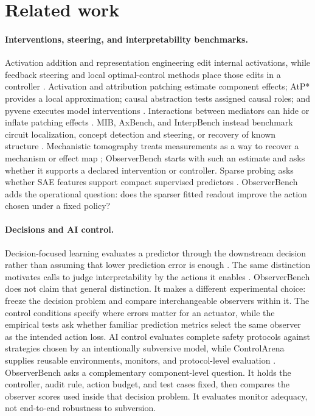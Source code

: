 \section{Related work}

\paragraph{Interventions, steering, and interpretability benchmarks.}
Activation addition and representation engineering edit internal activations,
while feedback steering and local optimal-control methods place those edits in a
controller
\cite{turner2023activation,zou2023representation,nguyen2025feedback,skifstad2026local}.
Activation and attribution patching estimate component effects; AtP* provides a
local approximation; causal abstraction tests assigned causal roles; and pyvene
executes model interventions
\cite{syed2024attribution,kramar2024atp,geiger2024alignments,wu2024pyvene}.
Interactions between mediators can hide or inflate patching effects
\cite{vaidyanathan2026curse}. MIB, AxBench, and InterpBench instead benchmark
circuit localization, concept detection and steering, or recovery of known
structure \cite{mueller2025mib,wu2025axbench,gupta2024interpbench}. Mechanistic
tomography treats measurements as a way to recover a mechanism or effect map
\cite{erramilli2026tomography}; ObserverBench starts with such an estimate and
asks whether it supports a declared intervention or controller.
Sparse probing asks whether SAE features support compact supervised predictors
\cite{kantamneni2025saeprobes}. ObserverBench adds the operational question:
does the sparser fitted readout improve the action chosen under a fixed policy?

\paragraph{Decisions and AI control.}
Decision-focused learning evaluates a predictor through the downstream decision
rather than assuming that lower prediction error is enough
\cite{donti2017task,elmachtoub2022smart}. The same distinction motivates calls
to judge interpretability by the actions it enables \cite{orgad2026actionable}.
ObserverBench does not claim that general distinction. It makes a different
experimental choice: freeze the decision problem and compare interchangeable
observers within it. The control conditions specify where errors matter for
an actuator, while the empirical tests ask whether familiar prediction
metrics select the same observer as the intended action loss.
AI control evaluates complete safety protocols against strategies chosen by an
intentionally subversive model, while ControlArena supplies reusable
environments, monitors, and protocol-level evaluation
\cite{greenblatt2024aicontrol,inglis2025controlarena}. ObserverBench asks a
complementary component-level question. It holds the controller, audit rule,
action budget, and test cases fixed, then compares the observer scores used
inside that decision problem. It evaluates monitor adequacy, not end-to-end
robustness to subversion.


